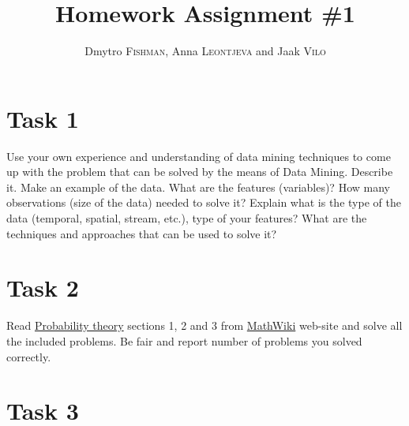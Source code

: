 \documentclass{article}
\title{Homework Assignment \#1} %
\author{Dmytro \textsc{Fishman}, Anna \textsc{Leontjeva} and Jaak \textsc{Vilo}} %
\begin{document}
\maketitle %
\section*{Task 1}
Use your own experience and understanding of data mining techniques to come up with the problem that can be solved by the means of Data Mining. Describe it. Make an example of the data. What are the features (variables)? How many observations (size of the data) needed to solve it? Explain what is the type of the data (temporal, spatial, stream, etc.), type of your features? What are the techniques and approaches that can be used to solve it?  

\section*{Task 2}
Read \href{http://mathwiki.cs.ut.ee/probability_theory}{Probability theory} sections 1, 2 and 3 from \href{http://mathwiki.cs.ut.ee/start}{MathWiki} web-site and solve all the included problems. Be fair and report number of problems you solved correctly.

\section*{Task 3}
\end{document}
